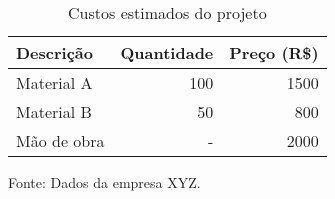 \begin{table}[htb]  
	
	\centering  
	
	\caption{Custos estimados do projeto}  
	
	\label{tab:custos}  
	
	\begin{tabular}{|l|r|r|}  
		
		\hline  
		
		Descrição & Quantidade & Preço (R\$) \\  
		
		\hline  
		
		Material A & 100 & 1500 \\  
		\hline 
		Material B & 50 & 800 \\  
		\hline 
		Mão de obra & - & 2000 \\  
		
		\hline  
		
	\end{tabular}  
	
	\vspace{0.5em}  %
	{\footnotesize Fonte: Dados da empresa XYZ.\par}  
	
\end{table}  
